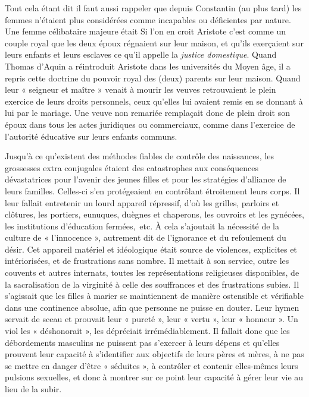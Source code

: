 Tout cela étant dit il faut aussi rappeler que depuis Constantin (au plus tard) les femmes n'étaient plus considérées comme incapables ou déficientes par nature. Une femme célibataire majeure était  Si l'on en croit Aristote c'est comme un couple royal que les deux époux régnaient sur leur maison, et qu'ils exerçaient sur leurs enfants et leurs esclaves ce qu'il appelle la \emph{justice domestique}. Quand Thomas d'Aquin a réintroduit Aristote dans les universités du Moyen âge, il a repris cette doctrine du pouvoir royal des (deux) parents sur leur maison. Quand leur « seigneur et maître » venait à mourir les veuves retrouvaient le plein exercice de leurs droits personnels, ceux qu'elles lui avaient remis en se donnant à lui par le mariage. Une veuve non remariée remplaçait donc de plein droit son époux dans tous les actes juridiques ou commerciaux, comme dans l'exercice de l'autorité éducative sur leurs enfants communs.  

Jusqu'à ce qu'existent des méthodes fiables de contrôle des naissances, les grossesses extra conjugales étaient des catastrophes aux conséquences dévastatrices pour l'avenir des jeunes filles et pour les stratégies d'alliance de leurs familles. Celles-ci s'en protégeaient en contrôlant étroitement leurs corps. Il leur fallait entretenir un lourd appareil répressif, d'où les grilles, parloirs et clôtures, les portiers, eunuques, duègnes et chaperons, les ouvroirs et les gynécées, les institutions d'éducation fermées,~etc. À cela s'ajoutait la nécessité de la culture de « l'innocence », autrement dit de l'ignorance et du refoulement du désir. Cet appareil matériel et idéologique était source de violences, explicites et intériorisées, et de frustrations sans nombre. Il mettait à son service, outre les couvents et autres internats, toutes les représentations religieuses disponibles, de la sacralisation de la virginité à celle des souffrances et des frustrations subies. Il s'agissait que les filles à marier se maintiennent de manière ostensible et vérifiable dans une continence absolue, afin que personne ne puisse en douter. Leur hymen servait de sceau et prouvait leur « pureté », leur « vertu », leur « honneur ». Un viol les « déshonorait », les dépréciait irrémédiablement. Il fallait donc que les débordements masculins ne puissent pas s'exercer à leurs dépens et qu'elles prouvent leur capacité à s'identifier aux objectifs de leurs pères et mères, à ne pas se mettre en danger d'être « séduites », à contrôler et contenir elles-mêmes leurs pulsions sexuelles, et donc à montrer sur ce point leur capacité à gérer leur vie au lieu de la subir. 
 
